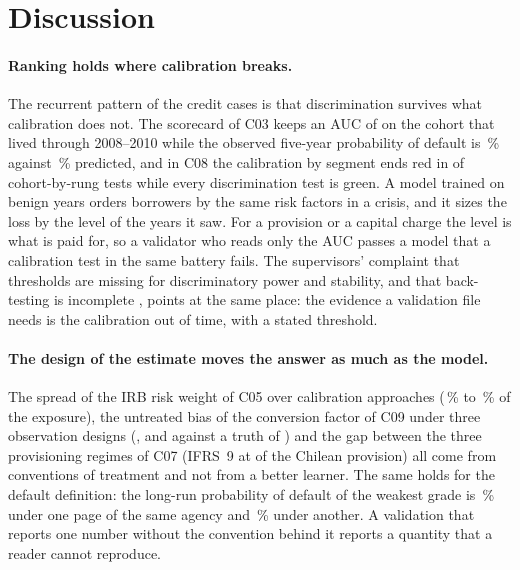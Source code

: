 \section{Discussion}
\label{sec:discussion}

\paragraph{Ranking holds where calibration breaks.} The recurrent pattern of the credit cases is that discrimination survives what calibration does not. The scorecard of C03 keeps an AUC of \rsCThreeAuc{} on the cohort that lived through 2008--2010 while the observed five-year probability of default is \rsCThreeObs{}\,\% against \rsCThreePred{}\,\% predicted, and in C08 the calibration by segment ends red in  of  cohort-by-rung tests while every discrimination test is green. A model trained on benign years orders borrowers by the same risk factors in a crisis, and it sizes the loss by the level of the years it saw. For a provision or a capital charge the level is what is paid for, so a validator who reads only the AUC passes a model that a calibration test in the same battery fails. The supervisors' complaint that thresholds are missing for discriminatory power and stability, and that back-testing is incomplete \citep{fr:ecbtrim}, points at the same place: the evidence a validation file needs is the calibration out of time, with a stated threshold.

\paragraph{The design of the estimate moves the answer as much as the model.} The spread of the IRB risk weight of C05 over \rsCFiveApproaches{} calibration approaches (\rsCFiveRwMin{}\,\% to \rsCFiveRwMax{}\,\% of the exposure), the untreated bias of the conversion factor of C09 under three observation designs (\rsCNineFixed{}, \rsCNineCohort{} and \rsCNineVariable{} against a truth of \rsCNineTruth{}) and the gap between the three provisioning regimes of C07 (IFRS~9 at \rsCSevenRatio{} of the Chilean provision) all come from conventions of treatment and not from a better learner. The same holds for the default definition: the long-run probability of default of the weakest grade is \pxOneRegCerepLong{}\,\% under one page of the same agency and \pxOneRegTransLong{}\,\% under another. A validation that reports one number without the convention behind it reports a quantity that a reader cannot reproduce.

